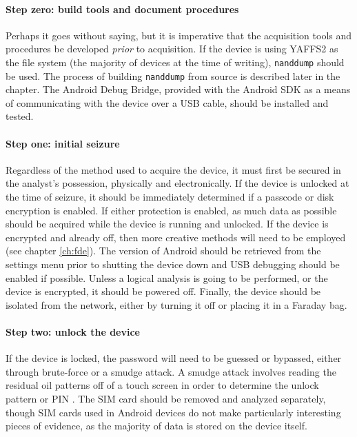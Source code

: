 \paragraph{Step zero: build tools and document procedures}
Perhaps it goes without saying, but it is imperative that the acquisition tools and procedures be developed \emph{prior} to
acquisition.  If the device is using YAFFS2 as the file system (the majority of devices at the time of writing), \texttt{nanddump}
should  be used.  The process of building \texttt{nanddump} from source is described later in the chapter.  The Android Debug
Bridge, provided with the Android SDK as a means of communicating with the device over a USB cable, should be installed and tested. 

\paragraph{Step one: initial seizure}
Regardless of the method used to acquire the device, it must first be secured in the analyst's possession, physically and
electronically.  If the device is unlocked at the time of seizure, it should be immediately determined if a passcode or disk
encryption is enabled. If either protection is enabled, as much data as possible should be acquired while the device is running and
unlocked.  If the device is encrypted and already off, then more creative methods will need to be employed (see chapter
\ref{ch:fde}).  The version of Android should be retrieved from the settings menu prior to shutting the device down and USB
debugging should be enabled if possible.  Unless a logical analysis is going to be performed, or the device is encrypted, it should
be powered off.  Finally, the device should be isolated from the network, either by turning it off or placing it in a Faraday bag.

\paragraph{Step two: unlock the device}
If the device is locked, the password will need to be guessed or bypassed, either through brute-force or a smudge attack.  A smudge
attack involves reading the residual oil patterns off of a touch screen in order to determine the unlock pattern or PIN
\cite{smudge}. The SIM card should be removed and analyzed separately, though SIM cards used in Android devices do not make
particularly interesting pieces of evidence, as the majority of data is stored on the device itself.

